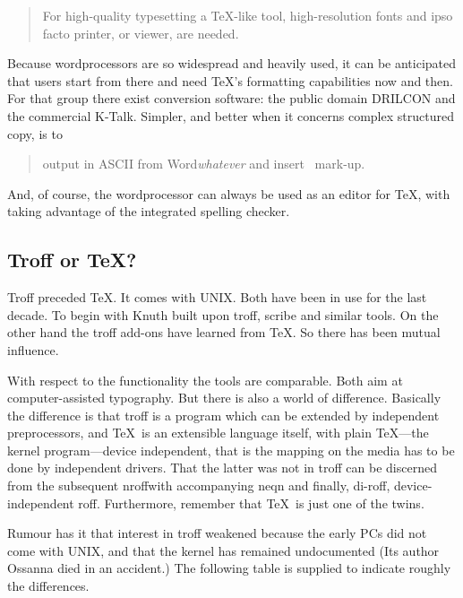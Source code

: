 \begin{quote}
For high-quality typesetting a \TeX-like tool,
high-resolution fonts and ipso facto printer, or viewer,
are needed.
\end{quote}
\noindent
Because wordprocessors are so widespread and heavily used, it can be
anticipated that users start from there and
need \TeX's formatting capabilities now and then.
For that group there exist conversion software:
the public domain DRILCON
and the commercial K-Talk.
Simpler, and better when it concerns complex structured copy,
is to
\begin{quote}
output in ASCII from Word{\it whatever\/}
and insert \AllTeX\ mark-up.
\end{quote}
\noindent And, of course, the wordprocessor can always be used as an editor
for \TeX, with taking advantage of the integrated spelling checker.

\subsection{Troff or \TeX?}
Troff preceded \TeX. It comes with UNIX.
Both have been in use for the last decade.
To begin with Knuth built upon troff, scribe and similar tools.
On the other hand the troff add-ons have learned from \TeX.
So there has been mutual influence.

With respect to the functionality the tools are comparable. Both aim at
computer-assisted typography. But there is also a world of difference.
Basically the difference is that troff is a program which can be
extended by independent preprocessors, and \TeX\ is an extensible
language itself, with plain \TeX---the kernel program---device independent,
that is the mapping on the media has to be done by independent drivers.
That the latter was not in troff
can be discerned from the subsequent nroff\Dash with accompanying neqn\Dash
and finally, di-roff, device-independent roff.
Furthermore, remember that \TeX\ is just one of the twins.

Rumour has it that interest in troff weakened because
the early PCs did not come with UNIX, and that
the kernel has remained undocumented (Its author Ossanna
died in an accident.)
The following table is supplied to indicate roughly the differences.

